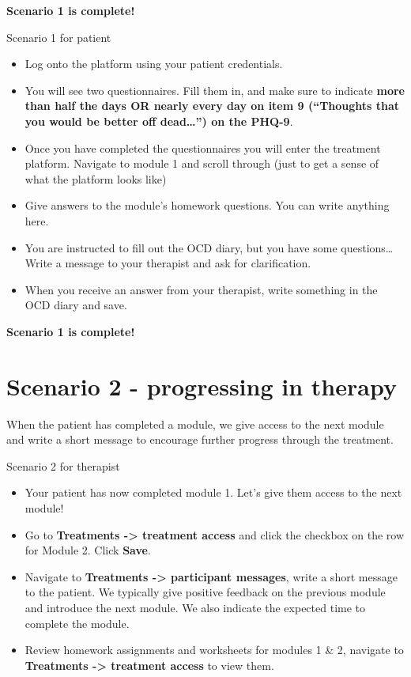 \documentclass[]{book}
\providecommand{\tightlist}{%
  \setlength{\itemsep}{0pt}\setlength{\parskip}{0pt}}
\begin{document}
\textbf{Scenario 1 is complete!}

 Scenario 1 for patient

\begin{itemize}
\tightlist
\item
  Log onto the platform using your patient credentials.
\item
  You will see two questionnaires. Fill them in, and make sure to indicate \textbf{more than half the days OR nearly every day on item 9 (``Thoughts that you would be better off dead\ldots{}'') on the PHQ-9}.
\item
  Once you have completed the questionnaires you will enter the treatment platform. Navigate to module 1 and scroll through (just to get a sense of what the platform looks like)
\item
  Give answers to the module's homework questions. You can write anything here.
\item
  You are instructed to fill out the OCD diary, but you have some questions\ldots{} Write a message to your therapist and ask for clarification.
\item
  When you receive an answer from your therapist, write something in the OCD diary and save.
\end{itemize}

\textbf{Scenario 1 is complete!}

\hypertarget{scenario-2---progressing-in-therapy}{%
\section{Scenario 2 - progressing in therapy}\label{scenario-2---progressing-in-therapy}}

When the patient has completed a module, we give access to the next module and write a short message to encourage further progress through the treatment.

 Scenario 2 for therapist

\begin{itemize}
\tightlist
\item
  Your patient has now completed module 1. Let's give them access to the next module!
\item
  Go to \textbf{Treatments -\textgreater{} treatment access} and click the checkbox on the row for Module 2. Click \textbf{Save}.
\item
  Navigate to \textbf{Treatments -\textgreater{} participant messages}, write a short message to the patient. We typically give positive feedback on the previous module and introduce the next module. We also indicate the expected time to complete the module.
\item
  Review homework assignments and worksheets for modules 1 \& 2, navigate to \textbf{Treatments -\textgreater{} treatment access} to view them.
\end{itemize}
\end{document}
